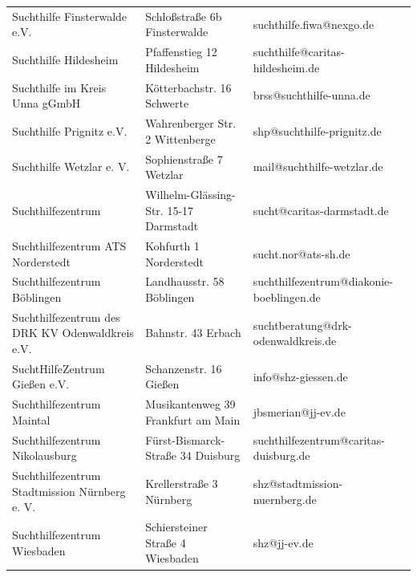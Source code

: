 {\begin{xltabular}{\textwidth} {
 >{\raggedright\arraybackslash}p{5cm}
 >{\raggedright\arraybackslash}X
 >{\raggedright\arraybackslash}p{5cm} }
Suchthilfe Finsterwalde e.V. & Schloßstraße 6b Finsterwalde & suchthilfe.fiwa@nexgo.de \\
Suchthilfe Hildesheim & Pfaffenstieg 12 Hildesheim & suchthilfe@caritas-hildesheim.de \\
Suchthilfe im Kreis Unna gGmbH & Kötterbachstr. 16 Schwerte & brss@suchthilfe-unna.de \\
Suchthilfe Prignitz e.V. & Wahrenberger Str. 2 Wittenberge & shp@suchthilfe-prignitz.de \\
Suchthilfe Wetzlar e. V. & Sophienstraße 7 Wetzlar & mail@suchthilfe-wetzlar.de \\
Suchthilfezentrum & Wilhelm-Glässing-Str. 15-17 Darmstadt & sucht@caritas-darmstadt.de \\
Suchthilfezentrum ATS Norderstedt & Kohfurth 1 Norderstedt & sucht.nor@ats-sh.de \\
Suchthilfezentrum Böblingen & Landhausstr. 58 Böblingen & suchthilfezentrum@diakonie-boeblingen.de \\
Suchthilfezentrum des DRK KV Odenwaldkreis e.V. & Bahnstr. 43 Erbach & suchtberatung@drk-odenwaldkreis.de \\
SuchtHilfeZentrum Gießen e.V. & Schanzenstr. 16 Gießen & info@shz-giessen.de \\
Suchthilfezentrum Maintal & Musikantenweg 39 Frankfurt am Main & jbsmerian@jj-ev.de \\
Suchthilfezentrum Nikolausburg & Fürst-Bismarck-Straße 34 Duisburg & suchthilfezentrum@caritas-duisburg.de \\
Suchthilfezentrum Stadtmission Nürnberg e. V. & Krellerstraße 3 Nürnberg & shz@stadtmission-nuernberg.de \\
Suchthilfezentrum Wiesbaden & Schiersteiner Straße 4 Wiesbaden & shz@jj-ev.de \\

\end{xltabular}}
